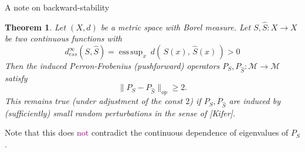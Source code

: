\documentclass[
  english,            %
  aspectratio=169,    %
]{tumbeamer}
\newtheorem{theorem}{Theorem}
\newtheorem{proposition}{Proposition}
\newtheorem{conjecture}{Conjecture}
\newenvironment{emphbox}
  {\begin{tcolorbox}[colback=blue!5!white,colframe=blue!75!black]}
  {\end{tcolorbox}}
\newcommand{\cM}{\mathcal{M}}
\renewcommand{\emph}[1]{\textcolor{purple}{#1}}
\DeclareMathOperator*{\esssup}{ess\,sup}
\begin{document}
\begin{frame}{A note on backward-stability}
  
\begin{theorem}
  Let $(X, d)$ be a metric space with Borel measure. Let $S,\hat{S} : X \to X$ be two continuous functions with 
  \begin{equation}
    d_{ess}^\infty (S, \hat{S}) = \esssup_{x}\ d(\, S(x),\, \hat{S}(x)\, ) > 0
  \end{equation}
  Then the induced Perron-Frobenius (pushforward) operators $P_S, P_{\hat{S}} : \cM \to \cM$ satisfy 
  \begin{equation}
    \| P_S - P_{\hat{S}} \|_{op} \geq 2 . 
  \end{equation}
  This remains true (under adjustment of the const $2$) if $P_S, P_{\hat{S}}$ are induced by (sufficiently) small random perturbations in the sense of [Kifer]. 
\end{theorem}

\begin{emphbox}
  Note that this does \emph{not} contradict the continuous dependence of eigenvalues of $P_S$. 
\end{emphbox}

\end{frame}

%  
%
%
%
\end{document}
